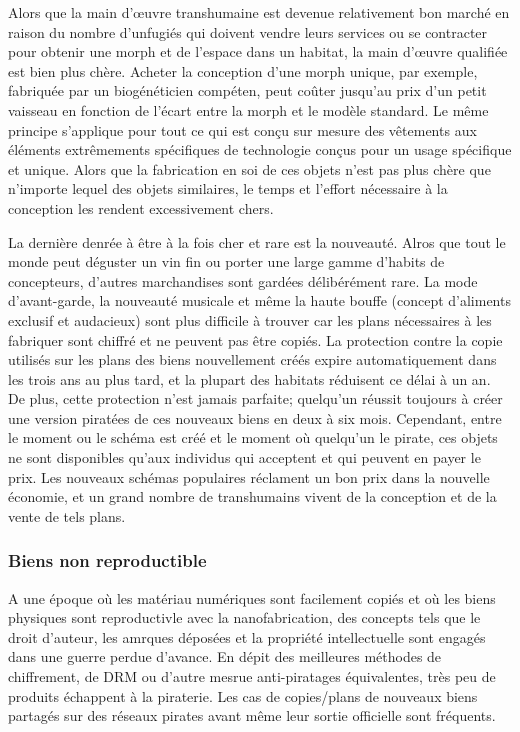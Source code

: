 Alors que la main d'œuvre transhumaine est devenue relativement bon marché en raison du nombre d'unfugiés qui doivent vendre leurs services ou se contracter pour obtenir une morph et de l'espace dans un habitat, la main d'œuvre qualifiée est bien plus chère. Acheter la conception d'une morph unique, par exemple, fabriquée par un biogénéticien compéten, peut coûter jusqu'au prix d'un petit vaisseau en fonction de l'écart entre la morph et le modèle standard. Le même principe s'applique pour tout ce qui est conçu sur mesure des vêtements aux éléments extrêmements spécifiques de technologie conçus pour un usage spécifique et unique. Alors que la fabrication en soi de ces objets n'est pas plus chère que n'importe lequel des objets similaires, le temps et l'effort nécessaire à la conception les rendent excessivement chers. 

La dernière denrée à être à la fois cher et rare est la nouveauté. Alros que tout le monde peut déguster un vin fin ou porter une large gamme d'habits de concepteurs, d'autres marchandises sont gardées délibérément rare. La mode d'avant-garde, la nouveauté musicale et même la haute bouffe (concept d'aliments exclusif et audacieux) sont plus difficile à trouver car les plans nécessaires à les fabriquer sont chiffré et ne peuvent pas être copiés. La protection contre la copie utilisés sur les plans des biens nouvellement créés expire automatiquement dans les trois ans au plus tard, et la plupart des habitats réduisent ce délai à un an. De plus, cette protection n'est jamais parfaite; quelqu'un réussit toujours à créer une version piratées de ces nouveaux biens en deux à six mois. Cependant, entre le moment ou le schéma est créé et le moment où quelqu'un le pirate, ces objets ne sont disponibles qu'aux individus qui acceptent et qui peuvent en payer le prix. Les nouveaux schémas populaires réclament un bon prix dans la nouvelle économie, et un grand nombre de transhumains vivent de la conception et de la vente de tels plans. 

\subsubsection{Biens non reproductible} \label{sec:irreproducible-goods} 

A une époque où les matériau numériques sont facilement copiés et où les biens physiques sont reproductivle avec la nanofabrication, des concepts tels que le droit d'auteur, les amrques déposées et la propriété intellectuelle sont engagés dans une guerre perdue d'avance. En dépit des meilleures méthodes de chiffrement, de DRM ou d'autre mesrue anti-piratages équivalentes, très peu de produits échappent à la piraterie. Les cas de copies/plans de nouveaux biens partagés sur des réseaux pirates avant même leur sortie officielle sont fréquents. 


